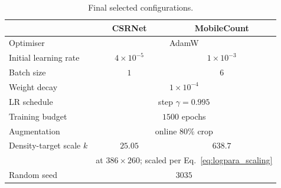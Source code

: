 \documentclass[conference]{IEEEtran}
\begin{document}
\begin{table}[h]
    \centering
    \caption{Final selected configurations.}
    \label{tab:final_configs}
    \begin{tabular}{lcc}
        \toprule
        & CSRNet & MobileCount \\
        \midrule
        Optimiser             & \multicolumn{2}{c}{AdamW} \\
        Initial learning rate & $4\times10^{-5}$ & $1\times10^{-3}$ \\
        Batch size            & $1$ & $6$ \\
        Weight decay          & \multicolumn{2}{c}{$1\times10^{-4}$} \\
        LR schedule           & \multicolumn{2}{c}{step $\gamma=0.995$} \\
        Training budget       & \multicolumn{2}{c}{$1500$ epochs} \\
        Augmentation          & \multicolumn{2}{c}{online $80\%$ crop} \\
        Density-target scale $k$ & $25.05$ & $638.7$ \\
        & \multicolumn{2}{c}{\footnotesize at $386\times260$; scaled per Eq.~\eqref{eq:logpara_scaling}} \\
        Random seed           & \multicolumn{2}{c}{$3035$} \\
        \bottomrule
    \end{tabular}
\end{table}



\end{document}
